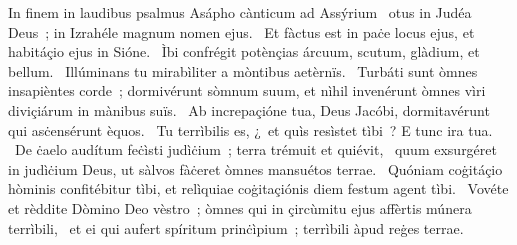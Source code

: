 { In finem in laudibus psalmus Asápho cànticum ad Assýrium}
{%
~otus in Judéa Deus~; in Izrahéle magnum nomen ejus. 
~Et fàctus est in paċe locus ejus, et habitáçio ejus in Sióne. 
~Ìbi confrégit potènçias árcuum, scutum, glàdium, et bellum. 
~Illúminans tu mirabìliter a mòntibus aetèrnïs. 
~Turbáti sunt òmnes insapièntes corde~; dormivérunt sòmnum suum, et nìhil invenérunt òmnes vìri diviçiárum in mànibus suïs. 
~Ab increpaçióne tua, Deus Jacóbi, dormitavérunt qui asċensérunt èquos. 
~Tu terrìbilis es, ¿~et quìs resìstet tìbi~? E tunc ira tua. 
~De ċaelo audítum feċìsti judìċium~; terra trémuit et quiévit, 
~quum exsurgéret in judìċium Deus, ut sàlvos fàċeret òmnes mansuétos terrae. 
~Quóniam coġitáçio hòminis confitébitur tìbi, et relìquiae coġitaçiónis diem festum agent tìbi. 
~Vovéte et rèddite Dòmino Deo vèstro~; òmnes qui in çircùmitu ejus affèrtis múnera terrìbili, 
~et ei qui aufert spíritum prinċìpium~; terrìbili àpud reġes terrae. 
}
